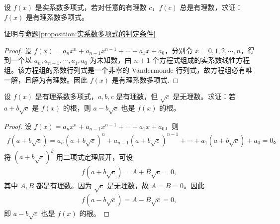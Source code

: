 \documentclass[../../main.tex]{subfiles}%
\begin{document}
\begin{proposition}\label{proposition:有理系数多项式的判定条件}
设 $f(x)$ 是实系数多项式，若对任意的有理数 $c$，$f(c)$ 总是有理数，求证：$f(x)$ 是有理系数多项式。
\end{proposition}
\begin{remark}
证明与\hyperref[proposition:实系数多项式的判定条件]{命题\ref{proposition:实系数多项式的判定条件}}
\end{remark}
\begin{proof}
设 $f(x) = a_n x^n + a_{n-1} x^{n-1} + \cdots + a_1 x + a_0$，分别令 $x = 0, 1, 2, \cdots, n$，得到一个以 $a_n, a_{n-1}, \cdots, a_1, a_0$ 为未知数，由 $n + 1$ 个方程式组成的实系数线性方程组。该方程组的系数行列式是一个非零的 Vandermonde 行列式，故方程组必有唯一解，且解为有理数。因此 $f(x)$ 是有理系数多项式.
\end{proof}

\begin{example}
设 $f(x)$ 是有理系数多项式，$a, b, c$ 是有理数，但 $\sqrt{c}$ 是无理数。求证：若 $a + b\sqrt{c}$ 是 $f(x)$ 的根，则 $a - b\sqrt{c}$ 也是 $f(x)$ 的根。
\end{example}
\begin{proof}
设 $f(x) = a_n x^n + a_{n-1} x^{n-1} + \cdots + a_1 x + a_0$，则
\begin{align*}
f(a + b\sqrt{c}) = a_n (a + b\sqrt{c})^n + a_{n-1} (a + b\sqrt{c})^{n-1} + \cdots + a_1 (a + b\sqrt{c}) + a_0 = 0。
\end{align*}
将 $(a + b\sqrt{c})^k$ 用二项式定理展开，可设
\begin{align*}
f(a + b\sqrt{c}) = A + B\sqrt{c} = 0,
\end{align*}
其中 $A, B$ 都是有理数。因为 $\sqrt{c}$ 是无理数，故 $A = B = 0$。因此
\begin{align*}
f(a - b\sqrt{c}) = A - B\sqrt{c} = 0,
\end{align*}
即 $a - b\sqrt{c}$ 也是 $f(x)$ 的根。
\end{proof}
\end{document}
